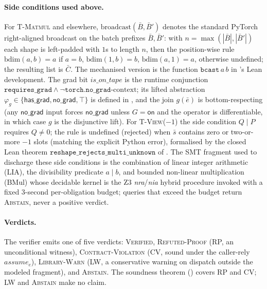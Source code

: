 \paragraph{Side conditions used above.} For \textsc{T-Matmul} and
elsewhere, $\mathrm{broadcast}(\bar B,\bar B')$ denotes the standard
PyTorch right-aligned broadcast on the batch prefixes
$\bar B,\bar B'$: with $n=\max(|\bar B|,|\bar B'|)$ each shape is
left-padded with $1$s to length $n$, then the position-wise rule
$\mathrm{bdim}(a,b)=a$ if $a=b$, $\mathrm{bdim}(1,b)=b$,
$\mathrm{bdim}(a,1)=a$, otherwise undefined; the resulting list is
$\bar C$. The mechanised version is the function
$\mathtt{bcast}\,a\,b$ in 's Lean development.
The grad bit $\mathit{is\_on\_tape}$ is the runtime conjunction
$\mathtt{requires\_grad}\wedge\neg\mathtt{torch.no\_grad}\text{-context}$;
its lifted abstraction $\varphi_g\in\{\mathsf{has\_grad},\mathsf{no\_grad},\top\}$
is defined in , and the join $g(\bar e)$
is bottom-respecting (any $\mathsf{no\_grad}$ input forces $\mathsf{no\_grad}$
unless $G=\mathsf{on}$ and the operator is differentiable, in which case
$g$ is the disjunctive lift). For \textsc{T-View($-1$)} the side
condition $Q\!\mid\!P$ requires $Q\neq 0$; the rule is undefined
(rejected) when $\bar s$ contains zero or two-or-more $-1$ slots
(matching the explicit Python error), formalised by the closed
Lean theorem $\mathtt{reshape\_rejects\_multi\_unknown}$ of
. The SMT fragment used to discharge these
side conditions is the combination of linear integer arithmetic
(LIA), the divisibility predicate $a\!\mid\!b$, and bounded
non-linear multiplication (BMul) whose decidable kernel is the
Z3 \emph{nra}/\emph{nia} hybrid procedure invoked with a fixed
3-second per-obligation budget; queries that exceed the budget
return \textsc{Abstain}, never a positive verdict.

\paragraph{Verdicts.} The verifier emits one of five verdicts:
\textsc{Verified}, \textsc{Refuted-Proof} (RP, an unconditional
witness), \textsc{Contract-Violation} (CV, sound under the
caller-rely $\mathit{assume}_e$), \textsc{Library-Warn} (LW, a
conservative warning on dispatch outside the modeled fragment),
and \textsc{Abstain}. The soundness theorem
() covers RP and CV; LW and \textsc{Abstain}
make no claim.

